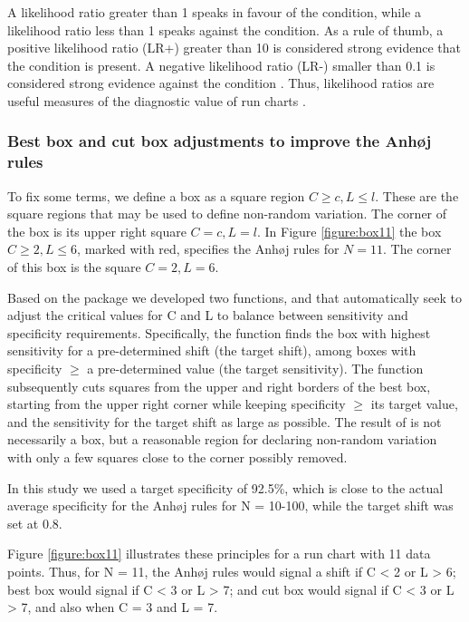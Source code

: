 A likelihood ratio greater than 1 speaks in favour of the condition,
while a likelihood ratio less than 1 speaks against the condition. As a
rule of thumb, a positive likelihood ratio (LR+) greater than 10 is
considered strong evidence that the condition is present. A negative
likelihood ratio (LR-) smaller than 0.1 is considered strong evidence
against the condition \citep{deeks2004}. Thus, likelihood ratios are
useful measures of the diagnostic value of run charts
\citep{anhoej2015, anhoej2018}.

\hypertarget{best-box-and-cut-box-adjustments-to-improve-the-anhj-rules}{%
\subsubsection{Best box and cut box adjustments to improve the Anhøj
rules}\label{best-box-and-cut-box-adjustments-to-improve-the-anhj-rules}}

To fix some terms, we define a box as a square region
\(C \geq c, L \leq l\). These are the square regions that may be used to
define non-random variation. The corner of the box is its upper right
square \(C = c, L = l\). In Figure \ref{figure:box11} the box
\(C \geq 2, L \leq 6\), marked with red, specifies the Anhøj rules for
\(N=11\). The corner of this box is the square \(C = 2, L = 6\).

Based on the  package we developed two functions,
 and  that automatically seek to adjust
the critical values for C and L to balance between sensitivity and
specificity requirements. Specifically, the  function
finds the box with highest sensitivity for a pre-determined shift (the
target shift), among boxes with specificity \(\geq\) a pre-determined
value (the target sensitivity). The  function
subsequently cuts squares from the upper and right borders of the best
box, starting from the upper right corner while keeping specificity
\(\geq\) its target value, and the sensitivity for the target shift as
large as possible. The result of  is not necessarily a
box, but a reasonable region for declaring non-random variation with
only a few squares close to the corner possibly removed.

In this study we used a target specificity of 92.5\%, which is close to
the actual average specificity for the Anhøj rules for N = 10-100, while
the target shift was set at 0.8.

Figure \ref{figure:box11} illustrates these principles for a run chart
with 11 data points. Thus, for N = 11, the Anhøj rules would signal a
shift if C \textless{} 2 or L \textgreater{} 6; best box would signal if
C \textless{} 3 or L \textgreater{} 7; and cut box would signal if C
\textless{} 3 or L \textgreater{} 7, and also when C = 3 and L = 7.

